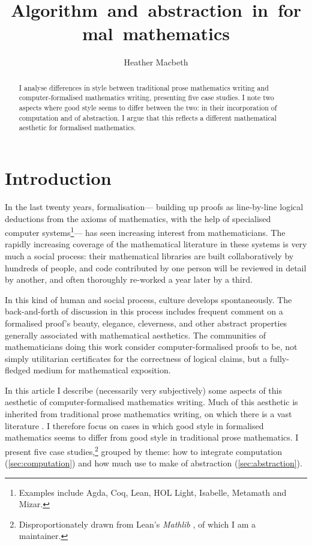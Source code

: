 \documentclass[runningheads]{llncs}
\begin{document}
%
\title{Algorithm~and~abstraction~in~formal~mathematics}

\author{Heather Macbeth}

%
\maketitle
%
\begin{abstract}
  I analyse differences in style between traditional prose mathematics writing and computer-formalised mathematics writing,
  presenting five case studies.
  I note two aspects where good style seems to differ between the two: in
  their incorporation of computation and of abstraction.
  I argue that this reflects a different mathematical aesthetic for formalised mathematics.
\end{abstract}
%
%
%
\section{Introduction}

In the last twenty years, formalisation---%
building up proofs as line-by-line logical deductions from the axioms of mathematics, with the help of specialised computer systems\footnote{
  Examples include Agda, Coq, Lean, HOL Light, Isabelle, Metamath and Mizar.}---%
has seen increasing interest from mathematicians. 
The rapidly increasing coverage of the mathematical literature in these systems
is very much a social process:
their mathematical libraries are built collaboratively by hundreds of people,
and code contributed by one person will be reviewed in detail by another,
and often thoroughly re-worked a year later by a third.

In this kind of human and social process, culture develops spontaneously.
The back-and-forth of discussion in this process includes frequent comment
on a formalised proof's beauty, elegance, cleverness,
and other abstract properties generally associated with mathematical aesthetics.
The communities of mathematicians doing this work
consider computer-formalised proofs to be,
not simply utilitarian certificates for the correctness of logical claims,
but a fully-fledged medium for mathematical exposition.

In this article I describe
(necessarily very subjectively)
some aspects of this aesthetic of computer-formalised mathematics writing.
Much of this aesthetic is inherited from traditional prose mathematics writing,
on which there is a vast literature \cite{Arn98,Bon82,Hal70,Har40,IA14,Mon12,Rot97,Tao07,Wel90}.
I therefore focus on cases in which good style in formalised mathematics
seems to differ from good style in traditional prose mathematics.
I present five case studies,\footnote{
Disproportionately drawn from Lean's \cite{Lean3,Lean4} 
\emph{Mathlib} \cite{Mathlib},
of which I am a maintainer.}
grouped by theme:
how to integrate computation (\cref{sec:computation})
and how much use to make of abstraction (\cref{sec:abstraction}).
\end{document}
